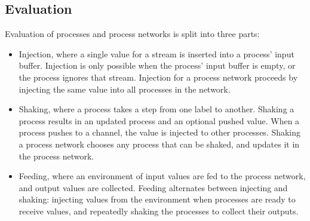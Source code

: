 % 
% 

\subsection{Evaluation}
\label{s:Process:Eval}




Evaluation of processes and process networks is split into three parts:
\begin{itemize}
\item Injection, where a single value for a stream is inserted into a process' input buffer.
Injection is only possible when the process' input buffer is empty, or the process ignores that stream.
Injection for a process network proceeds by injecting the same value into all processes in the network.

\item Shaking, where a process takes a step from one label to another.
Shaking a process results in an updated process and an optional pushed value.
When a process pushes to a channel, the value is injected to other processes.
Shaking a process network chooses any process that can be shaked, and updates it in the process network.

\item Feeding, where an environment of input values are fed to the process network, and output values are collected.
Feeding alternates between injecting and shaking: injecting values from the environment when processes are ready to receive values, and repeatedly shaking the processes to collect their outputs.
\end{itemize}

